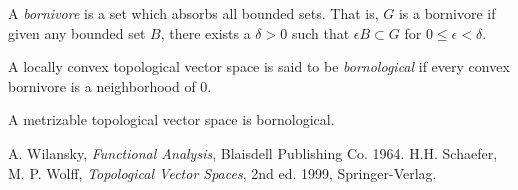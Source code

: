 \documentclass[12pt]{article}
\begin{document}
A {\it bornivore} is a set which absorbs all bounded sets.
That is, $G$ is a bornivore if given any bounded set $B$, there exists a $\delta > 0$ such that
$\epsilon B \subset G$ for $0 \leq \epsilon < \delta$.

A locally convex topological vector space is said to be {\it bornological} if every convex bornivore is a neighborhood of 0.

A metrizable topological vector space is bornological.

\begin{thebibliography}{99}
 A. Wilansky, \emph{Functional Analysis}, Blaisdell Publishing Co. 1964. 
 H.H. Schaefer, M. P. Wolff, \emph{Topological Vector Spaces},
2nd ed. 1999, Springer-Verlag.
\end{thebibliography}

\end{document}
